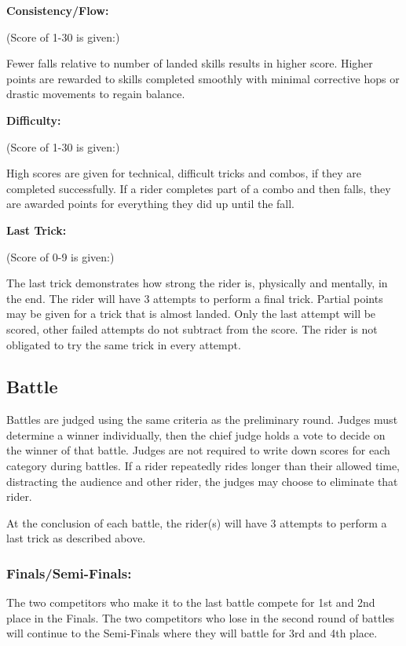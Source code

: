 \textbf{Consistency/Flow:}

(Score of 1-30 is given:)

Fewer falls relative to number of landed skills results in higher score.
Higher points are rewarded to skills completed smoothly with minimal corrective hops or drastic movements to regain balance.

\textbf{Difficulty:}

(Score of 1-30 is given:)

High scores are given for technical, difficult tricks and combos, if they are completed successfully.
If a rider completes part of a combo and then falls, they are awarded points for everything they did up until the fall. 

\textbf{Last Trick:}

(Score of 0-9 is given:)

The last trick demonstrates how strong the rider is, physically and mentally, in the end.
The rider will have 3 attempts to perform a final trick.
Partial points may be given for a trick that is almost landed.
Only the last attempt will be scored, other failed attempts do not subtract from the score.
The rider is not obligated to try the same trick in every attempt.

\subsection{Battle \label{subsec:flat-street_flatland-judging-scoring_battle}}
Battles are judged using the same criteria as the preliminary round.
Judges must determine a winner individually, then the chief judge holds a vote to decide on the winner of that battle.
Judges are not required to write down scores for each category during battles.
If a rider repeatedly rides longer than their allowed time, distracting the audience and other rider, the judges may choose to eliminate that rider.

At the conclusion of each battle, the rider(s) will have 3 attempts to perform a last trick as described above.

\subsubsection{Finals/Semi-Finals:}
The two competitors who make it to the last battle compete for 1st and 2nd place in the Finals.
The two competitors who lose in the second round of battles will continue to the Semi-Finals where they will battle for 3rd and 4th place.

